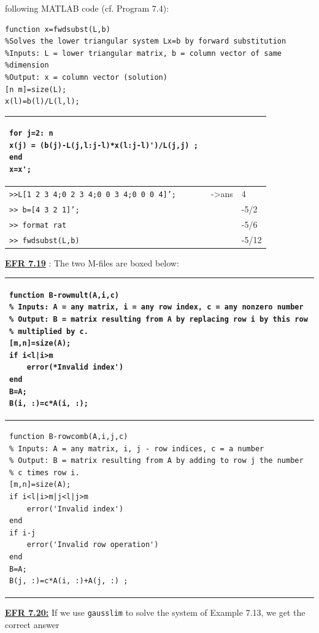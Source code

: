 \documentclass[../main.tex]{subfiles}
\begin{document}
following MATLAB code (cf. Program 7.4):
\begin{lstlisting}[numbers=none]
function x=fwdsubst(L,b) 
%Solves the lower triangular system Lx=b by forward substitution 
%Inputs: L = lower triangular matrix, b = column vector of same 
%dimension 
%Output: x = column vector (solution) 
[n m]=size(L); 
x(l)=b(l)/L(l,l); 
\end{lstlisting}
\begin{center}
\begin{tabular}{|l|l|l|}
\hline
\begin{lstlisting}[numbers=none,frame=none]
 for j=2: n 
x(j) = (b(j)-L(j,l:j-l)*x(l:j-l)')/L(j,j) ; 
end 
x=x'; 
\end{lstlisting}&&\\
\hline
\texttt{>>L[1 2 3 4;0 2 3 4;0 0 3 4;0 0 0 4]';}&->ans&4\\
\texttt{>> b=[4 3 2 1]'; }&&-5/2\\
\texttt{>> format rat}&&-5/6 \\
\texttt{>> fwdsubst(L,b)}&&-5/12\\
\hline
\end{tabular}
\end{center}
\textbf{\underline{EFR 7.19}} : The two M-files are boxed below:
\begin{center}
\begin{tabular}{|l|}
\hline
\begin{lstlisting}[numbers=none,frame=none]
function B-rowmult(A,i,c) 
% Inputs: A = any matrix, i = any row index, c = any nonzero number 
% Output: B = matrix resulting from A by replacing row i by this row 
% multiplied by c. 
[m,n]=size(A); 
if i<l|i>m 
	error(*Invalid index') 
end 
B=A; 
B(i, :)=c*A(i, :); 
\end{lstlisting}\\
\hline
\begin{lstlisting}[numbers=none,frame=none]
 function B-rowcomb(A,i,j,c) 
% Inputs: A = any matrix, i, j - row indices, c = a number 
% Output: B = matrix resulting from A by adding to row j the number 
% c times row i. 
[m,n]=size(A); 
if i<l|i>m|j<l|j>m 
	error('Invalid index') 
end 
if i-j 
	error('Invalid row operation') 
end 
B=A; 
B(j, :)=c*A(i, :)+A(j, :) ; 
\end{lstlisting}\\
\hline
\end{tabular}
\end{center}
\textbf{\underline{EFR 7.20:}} If we use \texttt{gausslim} to solve the system of Example 7.13, we get the correct answer 
\end{document}
